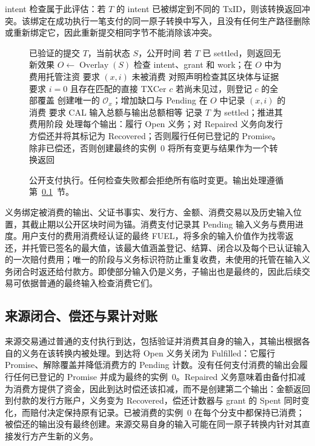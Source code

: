 intent 检查属于此评估：若 $T$ 的 intent 已被绑定到不同的 TxID，则该转换返回冲突。该绑定在成功执行一笔支付的同一原子转换中写入，且没有任何生产路径删除或重新绑定它，因此重新提交相同字节不能消除该冲突。

\begin{figure}[t]
  \small
  \begin{algorithmic}[1]
    \REQUIRE 已验证的提交 $T$，当前状态 $S$，公开时间
    \STATE 若 $T$ 已 settled，则返回无新效果
    \STATE $O\gets\operatorname{Overlay}(S)$
    \STATE 检查 intent、grant 和 work；在 $O$ 中为费用托管注资
      \STATE 要求 $(x,i)$ 未被消费
        \STATE 对照声明检查其区块体与证据
      \ELSE
        \STATE 要求 $i=0$ 且存在匹配的直接 TXCer $c$
        \STATE 若尚未见过，则登记 $c$ 的全部覆盖
        \STATE 创建唯一的 $\mathcal{O}_x$；增加缺口与 Pending
      \ENDIF
      \STATE 在 $O$ 中记录 $(x,i)$ 的消费
    \ENDFOR
    \STATE 要求 CAL 输入总额与输出总额相等
    \STATE 记录 $T$ 为 settled；推进其费用阶段
    \STATE 处理每个输出：履行 Open 义务；对 Repaired 义务向发行方偿还并将其标记为 Recovered；否则履行任何已登记的 Promise。除非已偿还，否则创建最终的实例~0
    \STATE 将所有变更与结果作为一个转换返回
  \end{algorithmic}
  \caption{公开支付执行。任何检查失败都会拒绝所有临时变更。输出处理遵循第~\ref{sec:protocol-closure}~节。}
  \label{fig:protocol-payment}
\end{figure}

义务绑定被消费的输出、父证书事实、发行方、金额、消费交易以及历史输入位置，其截止期以公开区块时间为锚。消费支付记录其 Pending 输入义务与费用进度。用户支付的费用消费经认证的最终 FUEL，将多余的输入价值作为找零返还，并托管已签名的最大值，该最大值涵盖登记、结算、闭合以及每个已认证输入的一次赔付费用；唯一的阶段与义务标识符防止重复收费，未使用的托管在输入义务闭合时返还给付款方。即使部分输入仍是义务，子输出也是最终的，因此后续交易可依据普通的最终输入检查消费它们。

\subsection{来源闭合、偿还与累计对账}
\label{sec:protocol-closure}

来源交易通过普通的支付执行到达，包括验证并消费其自身的输入，其输出根据各自的义务在该转换内被处理。到达将 Open 义务关闭为 Fulfilled：它履行 Promise、解除覆盖并降低消费方的 Pending 计数。没有任何支付消费的输出会履行任何已登记的 Promise 并成为最终的实例~0。Repaired 义务意味着由备付扣减为消费方提供了资金，因此到达时偿还该扣减，而不是创建第二个输出：金额返回到付款的发行方账户，义务变为 Recovered，偿还计数器与 grant 的 Spent 同时变化，而赔付决定保持原有记录。已被消费的实例~0 在每个分支中都保持已消费；被偿还的输出没有最终创建。来源交易自身的输入可能在同一原子转换内针对其直接发行方产生新的义务。

